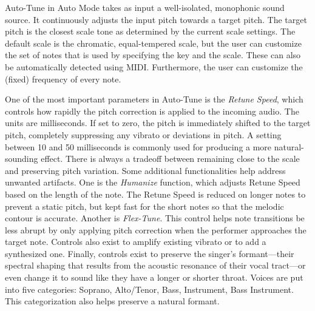 Auto-Tune in Auto Mode takes as input a well-isolated, monophonic sound source. It continuously adjusts the input pitch towards a target pitch. The target pitch is the closest scale tone as determined by the current scale settings. The default scale is the chromatic, equal-tempered scale, but the user can customize the set of notes that is used by specifying the key and the scale. These can also be automatically detected using MIDI. Furthermore, the user can customize the (fixed) frequency of every note.

One of the most important parameters in Auto-Tune is the \textit{Retune Speed}, which controls how rapidly the pitch correction is applied to the incoming audio. The units are milliseconds. If set to zero, the pitch is immediately shifted to the target pitch, completely suppressing any vibrato or deviations in pitch. A setting between 10 and 50 milliseconds is commonly used for producing a more natural-sounding effect. There is always a tradeoff between remaining close to the scale and preserving pitch variation. Some additional functionalities help address unwanted artifacts. One is the \textit{Humanize} function, which adjusts Retune Speed based on the length of the note. The Retune Speed is reduced on longer notes to prevent a static pitch, but kept fast for the short notes so that the melodic contour is accurate. Another is \textit{Flex-Tune}. This control helps note transitions be less abrupt by only applying pitch correction when the performer approaches the target note. Controls also exist to amplify existing vibrato or to add a synthesized one. Finally, controls exist to preserve the singer's formant---their spectral shaping that results from the acoustic resonance of their vocal tract---or even change it to sound like they have a longer or shorter throat. Voices are put into five categories: Soprano, Alto/Tenor, Bass, Instrument, Bass Instrument. This categorization also helps preserve a natural formant. 

